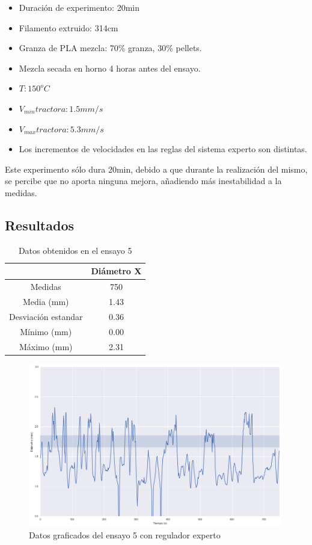 \begin{itemize}
	\item{Duración de experimento: 20min}
	\item{Filamento extruido: 314cm}
	\item{Granza de PLA mezcla: 70\% granza, 30\% pellets.}
	\item{Mezcla secada en horno 4 horas antes del ensayo.}
	\item{$T: 150^oC$}
	\item{$V_{min} tractora: 1.5 mm/s$}
	\item{$V_{max} tractora: 5.3 mm/s$}
	\item{Los incrementos de velocidades en las reglas del sistema experto son distintas.}
\end{itemize}

Este experimento sólo dura 20min, debido a que durante la realización del mismo, se percibe que no aporta ninguna mejora, añadiendo más inestabilidad a la medidas.

\subsection{Resultados}

\begin{table}[H]
	\centering
	\begin{tabular}{cc}
		                    & Diámetro X \\ \hline
		Medidas             & 750      \\
		Media (mm)          & 1.43       \\
		Desviación estandar & 0.36       \\
		Mínimo (mm)         & 0.00       \\
		Máximo (mm)         & 2.31      
	\end{tabular}
	\caption{Datos obtenidos en el ensayo 5}
	\label{tab:resl_ens5}
\end{table}

\begin{figure}[H]
    \centering
    \includegraphics[width=0.99\textwidth]{images/producciones/13082015/output_9_e2.png}
    \caption{Datos graficados del ensayo 5 con regulador experto}
    \label{fig:reg_graf5}
\end{figure}

